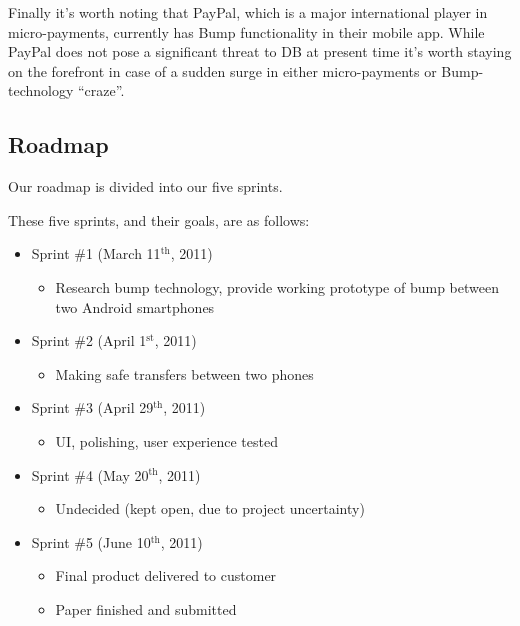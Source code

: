 \documentclass[a4paper,11pt]{article}
\begin{document}
Finally it's worth noting that PayPal, which is a major international player in micro-payments, currently has Bump functionality in their mobile app. While PayPal does not pose a significant threat to DB at present time it's worth staying on the forefront in case of a sudden surge in either micro-payments or Bump-technology ``craze''.

\subsection{Roadmap} %
\label{subsec:roadmap}
Our roadmap is divided into our five sprints.

These five sprints, and their goals, are as follows:
\begin{itemize}
	\item Sprint \#1 (March 11$^{\text{th}}$, 2011)
	\begin{itemize}
		\item Research bump technology, provide working prototype of bump between two Android smartphones
	\end{itemize}
	
	\item Sprint \#2 (April 1$^{\text{st}}$, 2011)
	\begin{itemize}
		\item Making safe transfers between two phones
	\end{itemize}
	
	\item Sprint \#3 (April 29$^{\text{th}}$, 2011)
	\begin{itemize}
		\item UI, polishing, user experience tested
	\end{itemize}
	
	\item Sprint \#4 (May 20$^{\text{th}}$, 2011)
	\begin{itemize}
		\item Undecided (kept open, due to project uncertainty)
	\end{itemize}
	
	\item Sprint \#5 (June 10$^{\text{th}}$, 2011)
	\begin{itemize}
		\item Final product delivered to customer
		\item Paper finished and submitted
	\end{itemize}
\end{itemize}
\end{document}
